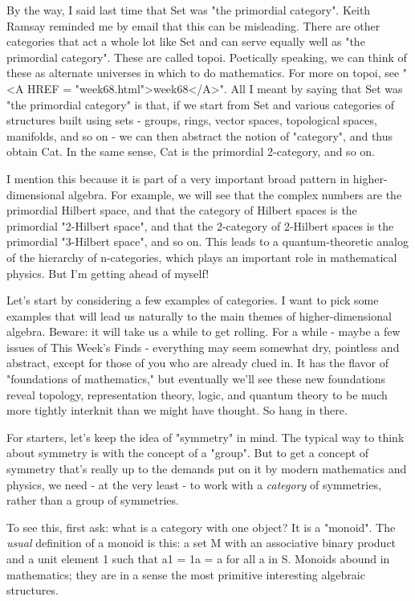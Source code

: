 By the way, I said last time that Set was "the primordial
category".  Keith Ramsay reminded me by email that this can be
misleading.  There are other categories that act a whole lot like Set
and can serve equally well as "the primordial category".
These are called topoi.  Poetically speaking, we can think of these as
alternate universes in which to do mathematics.  For more on topoi, see
"<A HREF = "week68.html">week68</A>".  All I meant by saying
that Set was "the primordial category" is that, if we start
from Set and various categories of structures built using sets - groups,
rings, vector spaces, topological spaces, manifolds, and so on - we can
then abstract the notion of "category", and thus obtain Cat.
In the same sense, Cat is the primordial 2-category, and so on.

I mention this because it is part of a very important broad pattern in
higher-dimensional algebra.  For example, we will see that the complex
numbers are the primordial Hilbert space, and that the category of
Hilbert spaces is the primordial "2-Hilbert space", and that
the 2-category of 2-Hilbert spaces is the primordial "3-Hilbert
space", and so on.  This leads to a quantum-theoretic analog of the
hierarchy of n-categories, which plays an important role in mathematical
physics.  But I'm getting ahead of myself!

Let's start by considering a few examples of categories.  I want to pick
some examples that will lead us naturally to the main themes of
higher-dimensional algebra.  Beware: it will take us a while to get
rolling.  For a while - maybe a few issues of This Week's Finds -
everything may seem somewhat dry, pointless and abstract, except for
those of you who are already clued in.  It has the flavor of
"foundations of mathematics," but eventually we'll see these new
foundations reveal topology, representation theory, logic, and quantum
theory to be much more tightly interknit than we might have thought.  So
hang in there.

For starters, let's keep the idea of "symmetry" in mind.  The typical
way to think about symmetry is with the concept of a "group".  But
to get a concept of symmetry that's really up to the demands put on it
by modern mathematics and physics, we need - at the very least - to
work with a \emph{category} of symmetries, rather than a group of symmetries.

To see this, first ask: what is a category with one object?  It is a
"monoid".  The \emph{usual} definition of a monoid is this: a set M
with an associative binary product and a unit element 1 such that a1 =
1a = a for all a in S.  Monoids abound in mathematics; they are in a
sense the most primitive interesting algebraic structures.

